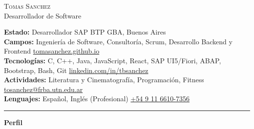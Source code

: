 \documentclass[10pt,A4]{article}
\newcommand{\cvsection}[1]
{
	\begin{center}
		\large\textcolor{sectcol}{\textbf{#1}}
	\end{center}
}
\newcommand{\metasection}[2]
{
\footnotesize{#2} \hspace*{\fill} \footnotesize{#1}\\[1pt]
}
\begin{document}
\pagestyle{fancy}








\vspace{-8pt}
\begin{center}
	\HUGE \textsc{Tomas Sanchez} \\[2pt]
	\small Desarrollador de Software
\end{center}



\vspace{6pt}


\metasection{GBA, Buenos Aires}{\textbf{Estado:} Desarrollador SAP BTP}
\metasection{\href{https://tomasanchez.github.io}{tomasanchez.github.io}}{\textbf{Campos:} Ingeniería de Software, Consultoría, Scrum, Desarrollo Backend y Frontend}
\metasection{\href{https://www.linkedin.com/in/tbsanchez/}{linkedin.com/in/tbsanchez}}{\textbf{Tecnologías:} C, C++, Java, JavaScript, React, SAP UI5/Fiori, ABAP, Bootstrap, Bash, Git}
\metasection{\href{mailto:tosanchez@frba.utn.edu.ar}{tosanchez@frba.utn.edu.ar}}{\textbf{Actividades:} Literatura y Cinematografía, Programación, Fitness}
\metasection{\href{tel:+5491166107356}{+54 9 11 6610-7356}}{\textbf{Lenguajes:} Español, Inglés (Profesional)}
\vspace{-2pt}
\textcolor{softcol}{\hrule}
\vspace{6pt}

\normalsize

\vspace{-6pt}
\cvsection{Perfil}
\end{document}
